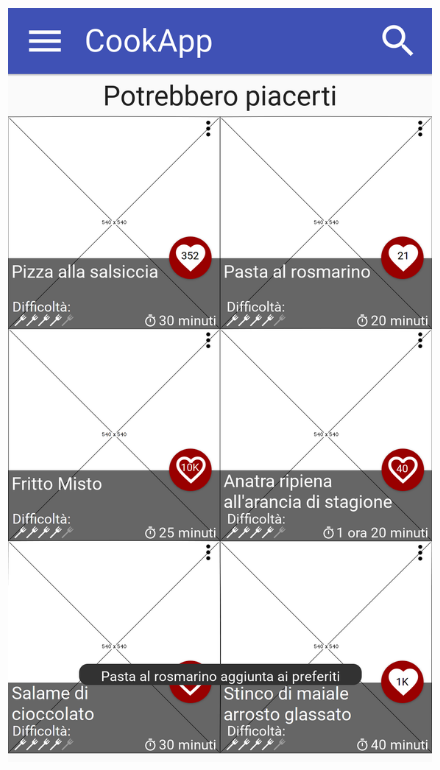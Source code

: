 \begin{figure}[H]
\begin{minipage}{.49\textwidth}
		\includegraphics[width=\textwidth]{img/wireframe/homepage_tooltip_preferiti.png}
	\end{minipage}
\end{figure}
